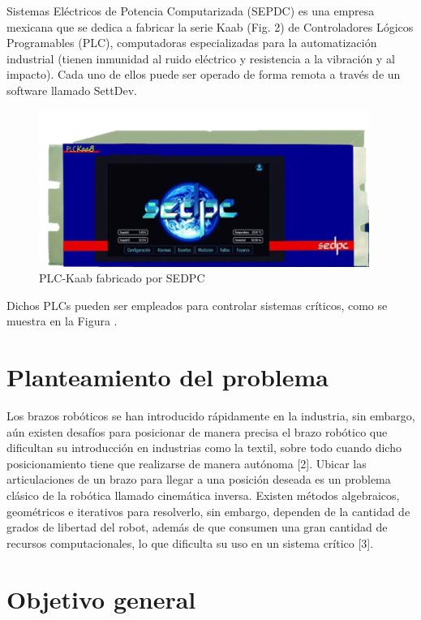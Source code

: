 \documentclass[12pt, twoside]{report}
\begin{document}
Sistemas Eléctricos de Potencia Computarizada (SEPDC) es una empresa mexicana que se dedica a fabricar la serie Kaab (Fig. 2) de Controladores Lógicos Programables (PLC), computadoras especializadas para la automatización industrial (tienen inmunidad al ruido eléctrico y resistencia a la vibración y al impacto). Cada uno de ellos puede ser operado de forma remota a través de un software llamado SettDev.

\begin{figure}[htb]
	\centering
	\includegraphics[scale=1]{plckaab.png}
	\caption{PLC-Kaab fabricado por SEDPC}
\end{figure}

Dichos PLCs pueden ser empleados para controlar sistemas críticos, como se muestra en la Figura .

\newpage
\section{Planteamiento del problema}

Los brazos robóticos se han introducido rápidamente en la industria, sin embargo, aún existen desafíos para posicionar de manera precisa el brazo robótico que dificultan su introducción en industrias como la textil, sobre todo cuando dicho posicionamiento tiene que realizarse de manera autónoma [2].
\newline\newline\newline
Ubicar las articulaciones de un brazo para llegar a una posición deseada es un problema clásico de la robótica llamado cinemática inversa. Existen métodos algebraicos, geométricos e iterativos para resolverlo, sin embargo, dependen de la cantidad de grados de libertad del robot, además de que consumen una gran cantidad de recursos computacionales, lo que dificulta su uso en un sistema crítico [3].

\newpage
\section{Objetivo general}
\end{document}

